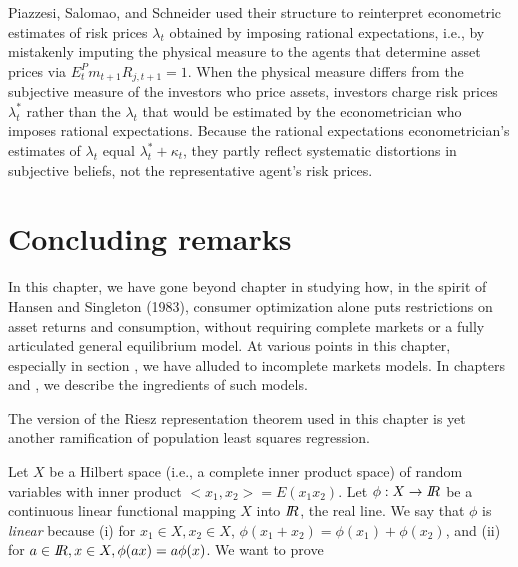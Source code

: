 
 Piazzesi, Salomao, and Schneider used their structure to reinterpret econometric  estimates of risk prices
$\lambda_t$ obtained by imposing rational expectations, i.e., by mistakenly imputing the physical measure to the agents that determine asset prices via $E_t^P m_{t+1} R_{j,t+1} =1$.
When the physical measure differs from the  subjective measure of the investors who price assets,
 investors charge risk prices $\lambda_t^*$
rather than the $\lambda_t$ that would be estimated by the econometrician who imposes rational expectations.  Because the rational expectations econometrician's estimates of
$\lambda_t$ equal $\lambda_t^* + \kappa_t$, they partly reflect systematic distortions in subjective beliefs, not the representative agent's risk prices.%





\section{Concluding remarks}%
In this chapter, we
have gone beyond chapter   in studying how, in the
spirit of Hansen and Singleton (1983),
consumer optimization alone puts restrictions on asset
returns and   consumption,  without requiring complete
markets or a fully articulated general equilibrium model.
 At various points in this chapter, especially in section , we have alluded to
incomplete markets models.  In chapters  and
,
we describe the ingredients of such models.



\label{appRiesz}%
The version of the {Riesz representation theorem}  used in this chapter is yet another ramification of population least squares regression.

Let $X$ be a Hilbert space (i.e., a complete inner product space) of random variables  with inner product $<x_1, x_2> = E (x_1 x_2) $.
Let $\phi: X \rightarrow {{I\kern-0.3em R}}$ be a  continuous linear functional mapping $X$ into ${I\kern-0.3em R}$, the real line.
We say that $\phi$ is {\it linear} because
(i) for $x_1 \in X, x_2 \in X$, $\phi(x_1+ x_2 ) = \phi(x_1) + \phi(x_2)$, and   (ii) for $a \in {{I\kern-0.3em R}}, x\in X,
\phi(a x ) = a \phi(x)$.  We want to prove


